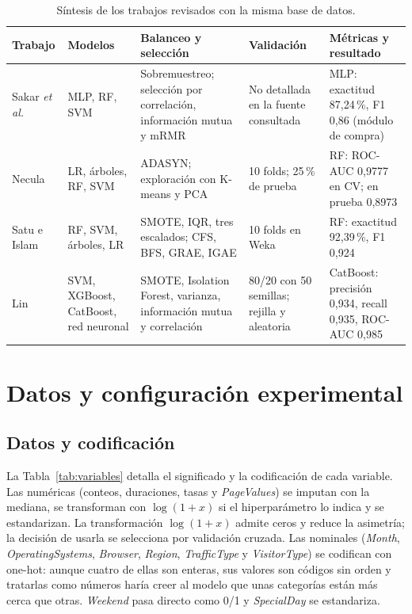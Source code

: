 \documentclass[journal]{IEEEtran}
\begin{document}
\begin{table}[t]
\centering
\caption{Síntesis de los trabajos revisados con la misma base de datos.}
\label{tab:estado}
\scriptsize
\renewcommand{\arraystretch}{1.08}
\begin{tabular}{p{2.4cm} p{3.0cm} p{3.4cm} p{3.1cm} p{4.1cm}}
\toprule
\textbf{Trabajo} & \textbf{Modelos} & \textbf{Balanceo y selección} & \textbf{Validación} & \textbf{Métricas y resultado} \\
\midrule
Sakar \textit{et al.} \cite{ref_sakar} & MLP, RF, SVM & Sobremuestreo; selección por correlación, información mutua y mRMR & No detallada en la fuente consultada & MLP: exactitud 87,24\,\%, F1 0,86 (módulo de compra) \\
Necula \cite{ref_necula} & LR, árboles, RF, SVM & ADASYN; exploración con K-means y PCA & 10 folds; 25\,\% de prueba & RF: ROC-AUC 0,9777 en CV; en prueba 0,8973 \\
Satu e Islam \cite{ref_satu} & RF, SVM, árboles, LR & SMOTE, IQR, tres escalados; CFS, BFS, GRAE, IGAE & 10 folds en Weka & RF: exactitud 92,39\,\%, F1 0,924 \\
Lin \cite{ref_lin} & SVM, XGBoost, CatBoost, red neuronal & SMOTE, Isolation Forest, varianza, información mutua y correlación & 80/20 con 50 semillas; rejilla y aleatoria & CatBoost: precisión 0,934, recall 0,935, ROC-AUC 0,985 \\
\bottomrule
\end{tabular}
\end{table}

\section{Datos y configuración experimental}
\label{sec:metodo}

\subsection{Datos y codificación}

La Tabla~\ref{tab:variables} detalla el significado y la codificación de cada variable. Las numéricas
(conteos, duraciones, tasas y \textit{PageValues}) se imputan con la mediana, se
transforman con $\log(1+x)$ si el hiperparámetro lo indica y se estandarizan. La
transformación $\log(1+x)$ admite ceros y reduce la asimetría; la decisión de usarla se
selecciona por validación cruzada. Las nominales (\textit{Month}, \textit{OperatingSystems},
\textit{Browser}, \textit{Region}, \textit{TrafficType} y \textit{VisitorType}) se codifican
con one-hot: aunque cuatro de ellas son enteras, sus valores son códigos sin orden y
tratarlas como números haría creer al modelo que unas categorías están más cerca que otras. \textit{Weekend} pasa directo
como 0/1 y \textit{SpecialDay} se estandariza.
\end{document}
